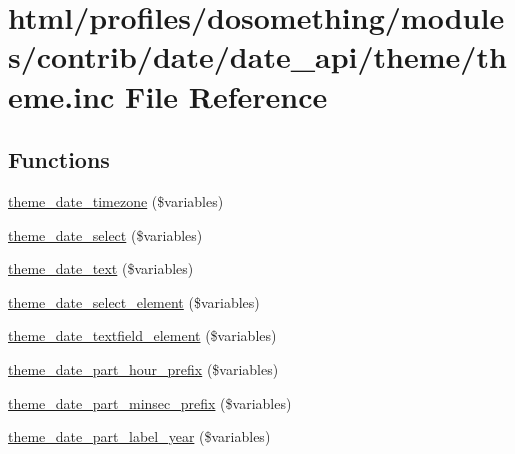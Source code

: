 \hypertarget{profiles_2dosomething_2modules_2contrib_2date_2date__api_2theme_2theme_8inc}{
\section{html/profiles/dosomething/modules/contrib/date/date\_\-api/theme/theme.inc File Reference}
\label{profiles_2dosomething_2modules_2contrib_2date_2date__api_2theme_2theme_8inc}
}
\subsection*{Functions}
\begin{DoxyCompactItemize}
\item 
\hyperlink{profiles_2dosomething_2modules_2contrib_2date_2date__api_2theme_2theme_8inc_a4aedc3082f36cba0074b2fa773e248df}{theme\_\-date\_\-timezone} (\$variables)
\item 
\hyperlink{profiles_2dosomething_2modules_2contrib_2date_2date__api_2theme_2theme_8inc_a7a7a2fac9a9d6d26c41dfa100e9150ee}{theme\_\-date\_\-select} (\$variables)
\item 
\hyperlink{profiles_2dosomething_2modules_2contrib_2date_2date__api_2theme_2theme_8inc_ae5d4bc24f64db6432fa33bbf0d89ce5b}{theme\_\-date\_\-text} (\$variables)
\item 
\hyperlink{profiles_2dosomething_2modules_2contrib_2date_2date__api_2theme_2theme_8inc_a2bfe4bbd77fc059daed2a92f9aa51736}{theme\_\-date\_\-select\_\-element} (\$variables)
\item 
\hyperlink{profiles_2dosomething_2modules_2contrib_2date_2date__api_2theme_2theme_8inc_a1bf50bb783fe2788e697d380c1cc9cce}{theme\_\-date\_\-textfield\_\-element} (\$variables)
\item 
\hyperlink{profiles_2dosomething_2modules_2contrib_2date_2date__api_2theme_2theme_8inc_a707dbcf3e6226ca43c43544811523dff}{theme\_\-date\_\-part\_\-hour\_\-prefix} (\$variables)
\item 
\hyperlink{profiles_2dosomething_2modules_2contrib_2date_2date__api_2theme_2theme_8inc_a0cfc0511719014321f866b76649bd9ac}{theme\_\-date\_\-part\_\-minsec\_\-prefix} (\$variables)
\item 
\hyperlink{profiles_2dosomething_2modules_2contrib_2date_2date__api_2theme_2theme_8inc_aa80cf0cc2785d368bd092dc38157b5d9}{theme\_\-date\_\-part\_\-label\_\-year} (\$variables)
\item 

\end{DoxyCompactItemize}
